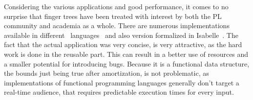 Considering the various applications and good performance, it comes to no surprise that finger trees have been treated with interest by both the PL community and academia as a whole. There are numerous implementations~\cite{Haskell} available in different~\cite{Scala} languages~\cite{OCaml} and also version formalized in Isabelle~\cite{Finger-Trees-AFP}. The fact that the actual application was very concise, is very attractive, as the hard work is done in the reusable part. This can result in a better use of resources and a smaller potential for introducing bugs. Because it is a functional data structure, the bounds just being true after amortization, is not problematic, as implementations of functional programming languages generally don't target a real-time audience, that requires predictable execution times for every input.